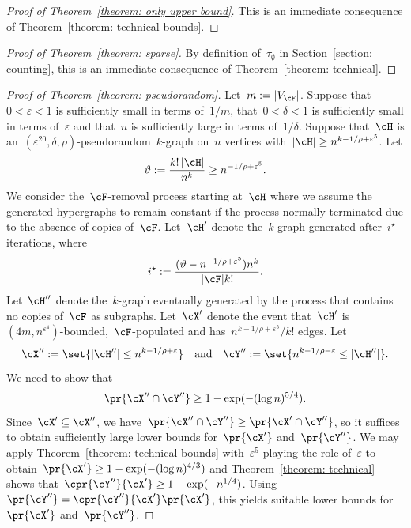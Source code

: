 \documentclass[11pt]{amsart}
\newcommand{\eps}{\varepsilon}
\DeclarePairedDelimiter{\abs}{\lvert}{\rvert}
\newcommand{\qtand}{\quad\text{and}\quad}
\renewcommand{\theta}{\vartheta}
\theoremstyle{definition}
\numberwithin{equation}{section}
\begin{document}
	\begin{proof}[Proof of Theorem~\ref{theorem: only upper bound}]
		This is an immediate consequence of Theorem~\ref{theorem: technical bounds}.
	\end{proof}

	\begin{proof}[Proof of Theorem~\ref{theorem: sparse}]
		By definition of~$\tau_\emptyset$ in Section~\ref{section: counting}, this is an immediate consequence of Theorem~\ref{theorem: technical}.
	\end{proof}

	\begin{proof}[Proof of Theorem~\ref{theorem: pseudorandom}]
		Let~$m:=\abs{V_\cF}$.
		Suppose that~$0<\eps<1$ is sufficiently small in terms of~$1/m$, that~$0<\delta<1$ is sufficiently small in terms of~$\eps$ and that~$n$ is sufficiently large in terms of~$1/\delta$.
		Suppose that~$\cH$ is an~$(\eps^{20},\delta,\rho)$-pseudorandom~$k$-graph on~$n$ vertices with~$\abs{\cH}\geq n^{k-1/\rho+\eps^5}$.
		Let
		\begin{equation*}
			\theta:=\frac{k!\,\abs{\cH}}{n^k}\geq n^{-1/\rho+\eps^5}.
		\end{equation*}
		We consider the~$\cF$-removal process starting at~$\cH$ where we assume the generated hypergraphs to remain constant if the process normally terminated due to the absence of copies of~$\cF$.
		Let~$\cH'$ denote the~$k$-graph generated after~$i^\star$ iterations, where
		\begin{equation*}
				i^\star:=\frac{(\theta-n^{-1/\rho+\eps^5})n^k}{\abs{\cF}k!}.
		\end{equation*}
		Let~$\cH''$ denote the~$k$-graph eventually generated by the process that contains no copies of~$\cF$ as subgraphs.
		Let~$\cX'$ denote the event that~$\cH'$ is~$(4m,n^{\eps^4})$-bounded,~$\cF$-populated and has~$n^{k-1/\rho+\eps^5}/k!$ edges.
		Let
		\begin{equation*}
			\cX'':=\set{\abs{\cH''}\leq n^{k-1/\rho+\eps}}\qtand
			\cY'':=\set{n^{k-1/\rho-\eps}\leq \abs{\cH''}}.
		\end{equation*}
		We need to show that
		\begin{equation*}
			\pr{\cX''\cap \cY''}\geq 1-\exp(-(\log n)^{5/4}).
		\end{equation*}
		Since~$\cX'\subseteq \cX''$, we have~$\pr{\cX''\cap \cY''}\geq \pr{\cX'\cap \cY''}$, so it suffices to obtain sufficiently large lower bounds for~$\pr{\cX'}$ and~$\pr{\cY''}$.
		We may apply Theorem~\ref{theorem: technical bounds} with~$\eps^5$ playing the role of~$\eps$ to obtain~$\pr{\cX'}\geq 1-\exp(-(\log n)^{4/3})$ and Theorem~\ref{theorem: technical} shows that~$\cpr{\cY''}{\cX'}\geq 1-\exp(-n^{1/4})$.
		Using~$\pr{\cY''}=\cpr{\cY''}{\cX'}\pr{\cX'}$, this yields suitable lower bounds for~$\pr{\cX'}$ and~$\pr{\cY''}$.
	\end{proof}
\end{document}
